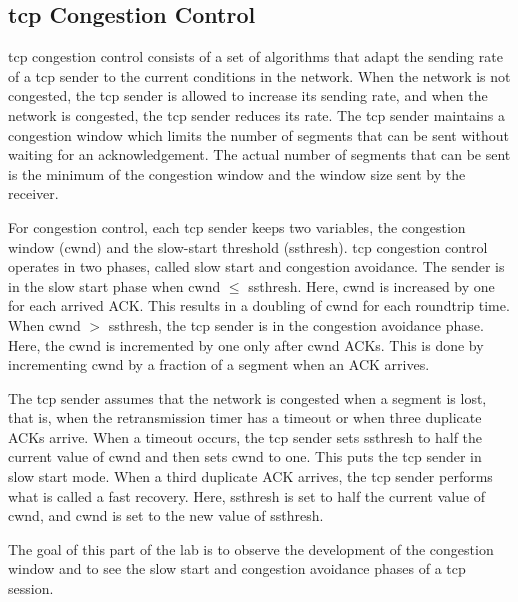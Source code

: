 \newpage
\subsection{\ac{tcp} Congestion Control}

\ac{tcp} congestion control consists of a set of algorithms that adapt the sending rate of a \ac{tcp} sender to the current conditions in the network. When the network is not congested, the \ac{tcp} sender is allowed to increase its sending rate, and when the network is congested, the \ac{tcp} sender reduces its rate. The \ac{tcp} sender maintains a congestion window which limits the number of segments that can be sent without waiting for an acknowledgement. The actual number of segments that can be sent is the minimum of the congestion window and the window size sent by the receiver.

For congestion control, each \ac{tcp} sender keeps two variables, the congestion window (cwnd) and the slow-start threshold (ssthresh). \ac{tcp} congestion control operates in two phases, called slow start and congestion avoidance. The sender is in the slow start phase when cwnd $\le$ ssthresh. Here, cwnd is increased by one for each arrived ACK. This results in a doubling of cwnd for each roundtrip time. When cwnd $>$ ssthresh, the \ac{tcp} sender is in the congestion avoidance phase. Here, the cwnd is incremented by one only after cwnd ACKs. This is done by incrementing cwnd by a fraction of a segment when an ACK arrives.

The \ac{tcp} sender assumes that the network is congested when a segment is lost, that is, when the retransmission timer has a timeout or when three duplicate ACKs arrive. When a timeout occurs, the \ac{tcp} sender sets ssthresh to half the current value of cwnd and then sets cwnd to one. This puts the \ac{tcp} sender in slow start mode. When a third duplicate ACK arrives, the \ac{tcp} sender performs what is called a fast recovery. Here, ssthresh is set to half the current value of cwnd, and cwnd is set to the new value of ssthresh.

The goal of this part of the lab is to observe the development of the congestion window and to see the slow start and congestion avoidance phases of a \ac{tcp} session.

